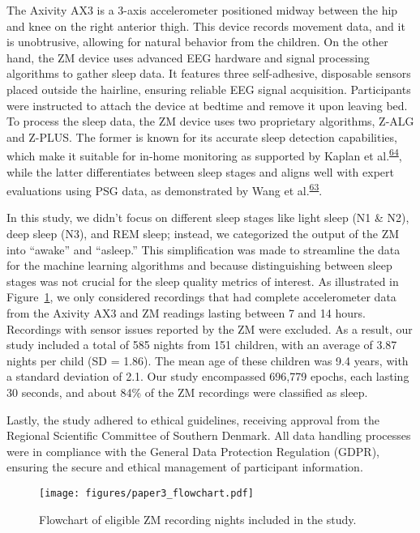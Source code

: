 \documentclass[
  9pt,
]{scrbook}
\begin{document}
The Axivity AX3 is a 3-axis accelerometer positioned midway between the
hip and knee on the right anterior thigh. This device records movement
data, and it is unobtrusive, allowing for natural behavior from the
children. On the other hand, the ZM device uses advanced EEG hardware
and signal processing algorithms to gather sleep data. It features three
self-adhesive, disposable sensors placed outside the hairline, ensuring
reliable EEG signal acquisition. Participants were instructed to attach
the device at bedtime and remove it upon leaving bed. To process the
sleep data, the ZM device uses two proprietary algorithms, Z-ALG and
Z-PLUS. The former is known for its accurate sleep detection
capabilities, which make it suitable for in-home monitoring as supported
by Kaplan et
al.\textsuperscript{\protect\hyperlink{ref-kaplan_performance_2014}{64}},
while the latter differentiates between sleep stages and aligns well
with expert evaluations using PSG data, as demonstrated by Wang et
al.\textsuperscript{\protect\hyperlink{ref-wang_evaluation_2015}{63}}.

In this study, we didn't focus on different sleep stages like light
sleep (N1 \& N2), deep sleep (N3), and REM sleep; instead, we
categorized the output of the ZM into ``awake'' and ``asleep.'' This
simplification was made to streamline the data for the machine learning
algorithms and because distinguishing between sleep stages was not
crucial for the sleep quality metrics of interest. As illustrated in
Figure~\ref{fig-paper3_flow}, we only considered recordings that had
complete accelerometer data from the Axivity AX3 and ZM readings lasting
between 7 and 14 hours. Recordings with sensor issues reported by the ZM
were excluded. As a result, our study included a total of 585 nights
from 151 children, with an average of 3.87 nights per child (SD = 1.86).
The mean age of these children was 9.4 years, with a standard deviation
of 2.1. Our study encompassed 696,779 epochs, each lasting 30 seconds,
and about 84\% of the ZM recordings were classified as sleep.

Lastly, the study adhered to ethical guidelines, receiving approval from
the Regional Scientific Committee of Southern Denmark. All data handling
processes were in compliance with the General Data Protection Regulation
(GDPR), ensuring the secure and ethical management of participant
information.

\begin{figure}

{\centering \texttt{[image: figures/paper3\_flowchart.pdf]}

}

\caption{\label{fig-paper3_flow}Flowchart of eligible ZM recording
nights included in the study.}

\end{figure}
\end{document}
